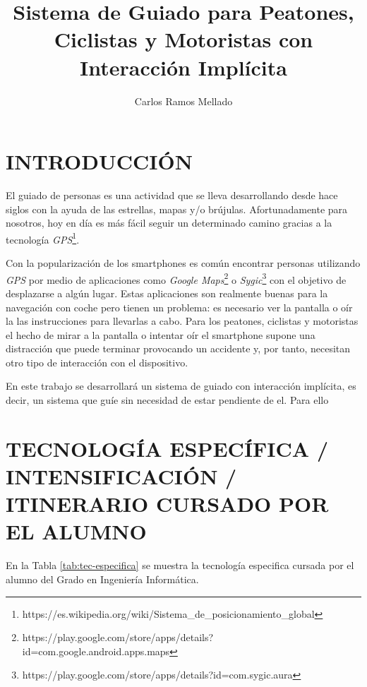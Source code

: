 \documentclass{pre-tfg}
\title{Sistema de Guiado para Peatones, Ciclistas y Motoristas con Interacción Implícita}
\author{Carlos Ramos Mellado}
\begin{document}
\maketitle
\tableofcontents

\newpage

\section{INTRODUCCIÓN}

El guiado de personas es una actividad que se lleva desarrollando desde hace siglos con la ayuda de las estrellas, mapas y/o brújulas. Afortunadamente para nosotros, hoy en día es más fácil seguir un determinado camino gracias a la tecnología \textit{GPS}\footnote{https://es.wikipedia.org/wiki/Sistema\_de\_posicionamiento\_global}.

Con la popularización de los smartphones es común encontrar personas utilizando \textit{GPS} por medio de aplicaciones como \textit{Google Maps}\footnote{https://play.google.com/store/apps/details?id=com.google.android.apps.maps} o \textit{Sygic}\footnote{https://play.google.com/store/apps/details?id=com.sygic.aura} con el objetivo de desplazarse a algún lugar. Estas aplicaciones son realmente buenas para la navegación con coche pero tienen un problema: es necesario ver la pantalla o oír la las instrucciones para llevarlas a cabo. Para los peatones, ciclistas y motoristas el hecho de mirar a la pantalla o intentar oír el smartphone supone una distracción que puede terminar provocando un accidente y, por tanto, necesitan otro tipo de interacción con el dispositivo.

En este trabajo se desarrollará un sistema de guiado con interacción implícita, es decir, un sistema que guíe sin necesidad de estar pendiente de el. Para ello



\newpage

\section{TECNOLOGÍA ESPECÍFICA / INTENSIFICACIÓN / ITINERARIO CURSADO POR EL ALUMNO}

En la Tabla \ref{tab:tec-especifica} se muestra la tecnología especifica cursada por el alumno del Grado en Ingeniería Informática.
\end{document}
